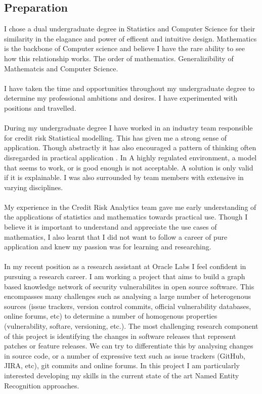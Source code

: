 \subsection*{Preparation}
I chose a dual undergraduate degree in Statistics and Computer Science for their similarity in the elagance and power of efficent and intuitive design. Mathematics is the backbone of Computer science and believe I have the rare ability to see how this relationship works. The order of mathematics. Generalizibility of Mathematcis and Computer Science.\\
\\
I have taken the time and opportunities throughout my undergraduate degree to determine my professional ambitions and desires. I have experimented with positions and travelled.\\
\\
During my undergraduate degree I have worked in an industry team responsible for credit risk Statistical modelling. This has  given me a strong sense of application. Though abstractly it has also encouraged a pattern of thinking often disregarded in practical application . In A highly regulated environment, a model that seems to work, or is good enough is not acceptable. A solution is only valid if it is explainable. I was also surrounded by team members with extensive in varying disciplines. \\
\\
My experience in the Credit Risk Analytics team gave me early understanding of the applications of statistics and mathematics towards practical use. Though I believe it is important to understand and appreciate the use cases of mathematics, I also learnt that I did not want to follow a career of pure application and knew my passion was for learning and researching.\\ 
\\
In my recent position as a research assistant at Oracle Labs I feel confident in pursuing a research career. I am working a project that aims to build a graph based knowledge network of security vulnerabilites in open source software. This encompasses many challenges such as analysing a large number of heterogenous sources (issue trackers, version control commits, official vulnerability databases, online forums, etc) to determine a number of homogenous properties (vulnerability, softare, versioning, etc.). The most challenging research component of this project is identifying the changes in software releases that represent patches or feature releases. We can try to differentiate this by analysing changes in source code, or a number of expressive text such as issue trackers (GitHub, JIRA, etc), git commits and online forums. In this project I am particularly interested developing my skills in the current state of the art Named Entity Recognition approaches.\\
